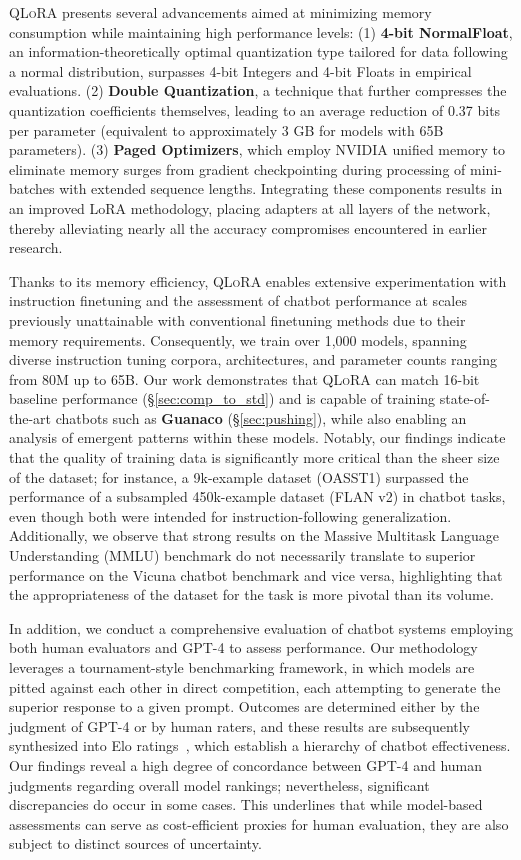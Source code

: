 \textsc{QLoRA} presents several advancements aimed at minimizing memory consumption while maintaining high performance levels: (1) \textbf{4-bit NormalFloat}, an information-theoretically optimal quantization type tailored for data following a normal distribution, surpasses 4-bit Integers and 4-bit Floats in empirical evaluations. (2) \textbf{Double Quantization}, a technique that further compresses the quantization coefficients themselves, leading to an average reduction of 0.37 bits per parameter (equivalent to approximately 3 GB for models with 65B parameters). (3) \textbf{Paged Optimizers}, which employ NVIDIA unified memory to eliminate memory surges from gradient checkpointing during processing of mini-batches with extended sequence lengths. Integrating these components results in an improved LoRA methodology, placing adapters at all layers of the network, thereby alleviating nearly all the accuracy compromises encountered in earlier research.

Thanks to its memory efficiency, \textsc{QLoRA} enables extensive experimentation with instruction finetuning and the assessment of chatbot performance at scales previously unattainable with conventional finetuning methods due to their memory requirements. Consequently, we train over 1,000 models, spanning diverse instruction tuning corpora, architectures, and parameter counts ranging from 80M up to 65B. Our work demonstrates that \textsc{QLoRA} can match 16-bit baseline performance (\S\ref{sec:comp_to_std}) and is capable of training state-of-the-art chatbots such as \textbf{Guanaco} (\S\ref{sec:pushing}), while also enabling an analysis of emergent patterns within these models. Notably, our findings indicate that the quality of training data is significantly more critical than the sheer size of the dataset; for instance, a 9k-example dataset (OASST1) surpassed the performance of a subsampled 450k-example dataset (FLAN v2) in chatbot tasks, even though both were intended for instruction-following generalization. Additionally, we observe that strong results on the Massive Multitask Language Understanding (MMLU) benchmark do not necessarily translate to superior performance on the Vicuna chatbot benchmark and vice versa, highlighting that the appropriateness of the dataset for the task is more pivotal than its volume.

In addition, we conduct a comprehensive evaluation of chatbot systems employing both human evaluators and GPT-4 to assess performance. Our methodology leverages a tournament-style benchmarking framework, in which models are pitted against each other in direct competition, each attempting to generate the superior response to a given prompt. Outcomes are determined either by the judgment of GPT-4 or by human raters, and these results are subsequently synthesized into Elo ratings~\citep{elo1967proposed, elo1978rating}, which establish a hierarchy of chatbot effectiveness. Our findings reveal a high degree of concordance between GPT-4 and human judgments regarding overall model rankings; nevertheless, significant discrepancies do occur in some cases. This underlines that while model-based assessments can serve as cost-efficient proxies for human evaluation, they are also subject to distinct sources of uncertainty.

